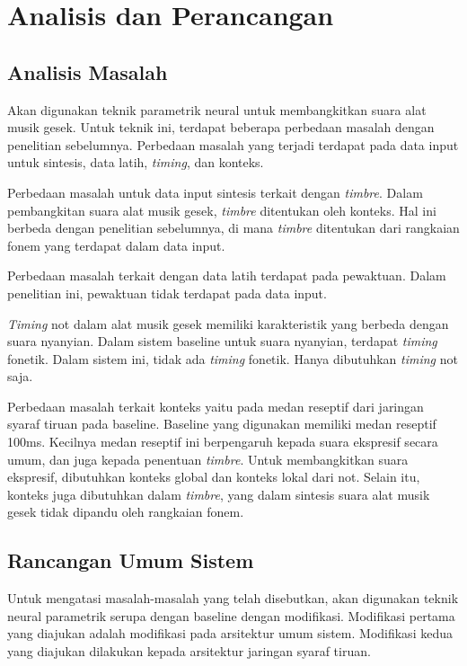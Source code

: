 \chapter{Analisis dan Perancangan}

\section{Analisis Masalah}

Akan digunakan teknik parametrik neural untuk membangkitkan suara alat musik gesek. Untuk teknik ini, terdapat beberapa perbedaan masalah dengan penelitian sebelumnya\parencite{bonada2017singing}. Perbedaan masalah yang terjadi terdapat pada data input untuk sintesis, data latih, \textit{timing}, dan konteks.

Perbedaan masalah untuk data input sintesis terkait dengan \textit{timbre}. Dalam pembangkitan suara alat musik gesek, \textit{timbre} ditentukan oleh konteks. Hal ini berbeda dengan penelitian sebelumnya, di mana \textit{timbre} ditentukan dari rangkaian fonem yang terdapat dalam data input.

Perbedaan masalah terkait dengan data latih terdapat pada pewaktuan. Dalam penelitian ini, pewaktuan tidak terdapat pada data input.

\textit{Timing} not dalam alat musik gesek memiliki karakteristik yang berbeda dengan suara nyanyian. Dalam sistem baseline untuk suara nyanyian, terdapat \textit{timing} fonetik. Dalam sistem ini, tidak ada \textit{timing} fonetik. Hanya dibutuhkan \textit{timing} not saja.

Perbedaan masalah terkait konteks yaitu pada medan reseptif dari jaringan syaraf tiruan pada baseline. Baseline yang digunakan memiliki medan reseptif 100ms. Kecilnya medan reseptif ini berpengaruh kepada suara ekspresif secara umum, dan juga kepada penentuan \textit{timbre}. Untuk membangkitkan suara ekspresif, dibutuhkan konteks global dan konteks lokal dari not. Selain itu, konteks juga dibutuhkan dalam \textit{timbre}, yang dalam sintesis suara alat musik gesek tidak dipandu oleh rangkaian fonem.

\section{Rancangan Umum Sistem}

Untuk mengatasi masalah-masalah yang telah disebutkan, akan digunakan teknik neural parametrik serupa dengan baseline\parencite{bonada2017singing} dengan modifikasi. Modifikasi pertama yang diajukan adalah modifikasi pada arsitektur umum sistem. Modifikasi kedua yang diajukan dilakukan kepada arsitektur jaringan syaraf tiruan.

